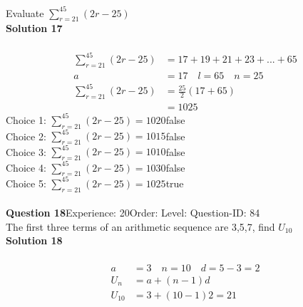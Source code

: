 \documentclass{article}
\begin{document}
Evaluate $\displaystyle\sum_{r=21}^{45} (2r-25)$\\[4pt]
\noindent\textbf{Solution 17}\\[2pt]
\\[-35pt]\begin{align*}
\displaystyle\sum_{r=21}^{45} (2r-25)&=17+19+21+23+...+65\\[2pt]
a&=17\quad l=65 \quad n=25\\[2pt]
\displaystyle\sum_{r=21}^{45} (2r-25)&=\displaystyle\frac{25}{2}(17+65)\\[2pt]
&=1025
\end{align*}
Choice 1: \hspace{20pt}$\displaystyle\sum_{r=21}^{45} (2r-25)=1020$\hspace{20pt}false\\
Choice 2: \hspace{20pt}$\displaystyle\sum_{r=21}^{45} (2r-25)=1015$\hspace{20pt}false\\
Choice 3: \hspace{20pt}$\displaystyle\sum_{r=21}^{45} (2r-25)=1010$\hspace{20pt}false\\
Choice 4: \hspace{20pt}$\displaystyle\sum_{r=21}^{45} (2r-25)=1030$\hspace{20pt}false\\
Choice 5: \hspace{20pt}$\displaystyle\sum_{r=21}^{45} (2r-25)=1025$\hspace{20pt}true\\
\\[4pt]
\noindent\textbf{Question 18}\hspace{20pt}Experience: 20\hspace{20pt}Order: \hspace{20pt}Level: \hspace{20pt}Question-ID: 84\\[2pt]
The first three terms of an arithmetic sequence are 3,5,7, find $U_{10}$\\[4pt]
\noindent\textbf{Solution 18}\\[2pt]
\\[-35pt]\begin{align*}
a&=3\quad n=10 \quad d=5-3=2\\[2pt]
U_n&=a+(n-1)d\\[12pt]
U_{10}&=3+(10-1)2=21\\[2pt]
\end{align*}
\end{document}
